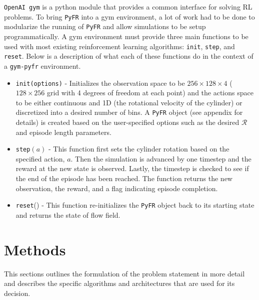 \documentclass{article}
\begin{document}
\verb|OpenAI gym| is a python module that provides a common interface for solving RL problems. To bring \verb|PyFR| into a gym environment, a lot of work had to be done to modularize the running of \verb|PyFR| and allow simulations to be setup programmatically. A gym environment must provide three main functions to be used with most existing reinforcement learning algorithms: \verb|init|, \verb|step|, and \verb|reset|. Below is a description of what each of these functions do in the context of a \verb|gym-pyfr| environment.

\begin{itemize}
    \item \verb|init(options)| - Initializes the observation space to be $256 \times 128 \times 4$ ($128 \times 256$ grid with 4 degrees of freedom at each point) and the actions space to be either continuous and 1D (the rotational velocity of the cylinder) or discretized into a desired number of bins. A \verb|PyFR| object (see appendix for details) is created based on the user-specified options such as the desired $\mathcal{R}$ and episode length parameters.
    \item \verb|step|$(a)$ - This function first sets the cylinder rotation based on the specified action, $a$. Then the simulation is advanced by one timestep and the reward at the new state is observed. Lastly, the timestep is checked to see if the end of the episode has been reached. The function returns the new observation, the reward, and a flag indicating episode completion.
    \item \verb|reset|() - This function re-initializes the \verb|PyFR| object back to its starting state and returns the state of flow field.
\end{itemize}


\section{ Methods }
\label{sec:methods}
This sections outlines the formulation of the problem statement in more detail and describes the specific algorithms and architectures that are used for its decision. 
\end{document}
